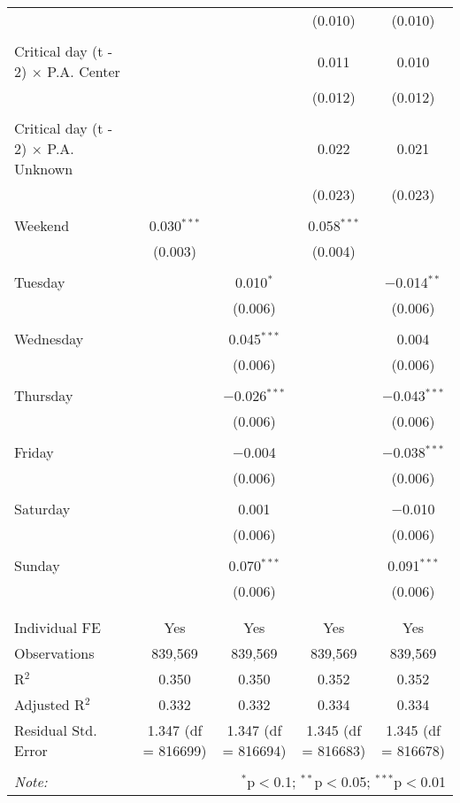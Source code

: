 \documentclass[
]{article}
\begin{document}
\begin{table}[!htbp]
{\begin{tabular}{@{\extracolsep{5pt}}lcccc}
  &  &  & (0.010) & (0.010) \\ 
  & & & & \\ 
 Critical day (t - 2) $\times$ P.A. Center &  &  & 0.011 & 0.010 \\ 
  &  &  & (0.012) & (0.012) \\ 
  & & & & \\ 
 Critical day (t - 2) $\times$ P.A. Unknown &  &  & 0.022 & 0.021 \\ 
  &  &  & (0.023) & (0.023) \\ 
  & & & & \\ 
 Weekend & 0.030$^{***}$ &  & 0.058$^{***}$ &  \\ 
  & (0.003) &  & (0.004) &  \\ 
  & & & & \\ 
 Tuesday &  & 0.010$^{*}$ &  & $-$0.014$^{**}$ \\ 
  &  & (0.006) &  & (0.006) \\ 
  & & & & \\ 
 Wednesday &  & 0.045$^{***}$ &  & 0.004 \\ 
  &  & (0.006) &  & (0.006) \\ 
  & & & & \\ 
 Thursday &  & $-$0.026$^{***}$ &  & $-$0.043$^{***}$ \\ 
  &  & (0.006) &  & (0.006) \\ 
  & & & & \\ 
 Friday &  & $-$0.004 &  & $-$0.038$^{***}$ \\ 
  &  & (0.006) &  & (0.006) \\ 
  & & & & \\ 
 Saturday &  & 0.001 &  & $-$0.010 \\ 
  &  & (0.006) &  & (0.006) \\ 
  & & & & \\ 
 Sunday &  & 0.070$^{***}$ &  & 0.091$^{***}$ \\ 
  &  & (0.006) &  & (0.006) \\ 
  & & & & \\ 
\hline \\[-1.8ex] 
Individual FE & Yes & Yes & Yes & Yes \\ 
Observations & 839,569 & 839,569 & 839,569 & 839,569 \\ 
R$^{2}$ & 0.350 & 0.350 & 0.352 & 0.352 \\ 
Adjusted R$^{2}$ & 0.332 & 0.332 & 0.334 & 0.334 \\ 
Residual Std. Error & 1.347 (df = 816699) & 1.347 (df = 816694) & 1.345 (df = 816683) & 1.345 (df = 816678) \\ 
\hline 
\hline \\[-1.8ex] 
\textit{Note:}  & \multicolumn{4}{r}{$^{*}$p$<$0.1; $^{**}$p$<$0.05; $^{***}$p$<$0.01} \\ 
\end{tabular}
} 
\end{table} 
\newpage
\end{document}
